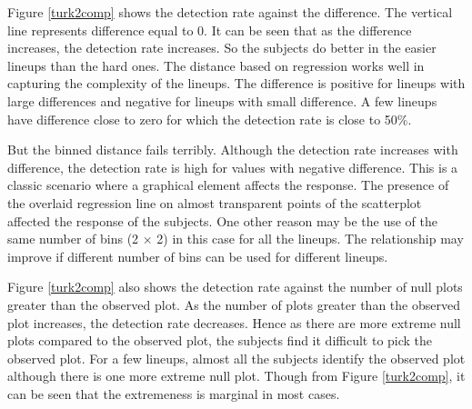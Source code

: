 \documentclass[12]{article}
\begin{document}
Figure \ref{turk2comp} shows the detection rate against the difference. The vertical line represents difference equal to 0. It can be seen that as the difference increases, the detection rate increases. So the subjects do better in the easier lineups than the hard ones. The distance based on regression works well in capturing the complexity of the lineups. The difference is positive for lineups with large differences and negative for lineups with small difference. A few lineups have difference close to zero for which the detection rate is close to 50\%.

But the binned distance fails terribly. Although the detection rate increases with difference, the detection rate is high for values with negative difference. This is a classic scenario where a graphical element affects the response. The presence of the overlaid regression line on almost transparent points of the scatterplot affected the response of the subjects. One other reason may be the use of the same number of bins (2 $\times$ 2) in this case for all the lineups. The relationship may improve if different number of bins can be used for different lineups.

Figure \ref{turk2comp} also shows the detection rate against the number of null plots greater than the observed plot. As the number of plots greater than the observed plot increases, the detection rate decreases.  Hence as there are more extreme null plots compared to the observed plot, the subjects find it difficult to pick the observed plot. For a few lineups, almost all the subjects identify the observed plot although there is one more extreme null plot. Though from Figure \ref{turk2comp}, it can be seen that the extremeness is marginal in most cases. 
\end{document}
